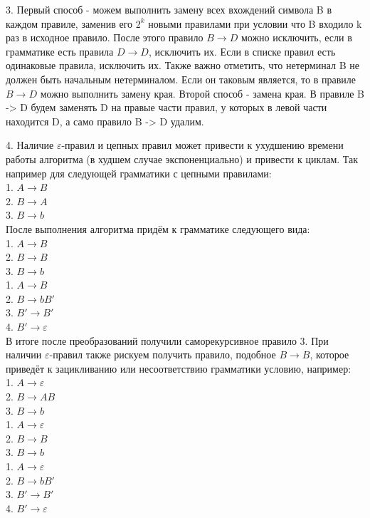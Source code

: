 \documentclass[a4paper,14pt]{extarticle}
\begin{document}
3. Первый способ - можем выполнить замену всех вхождений 
символа B в каждом правиле, заменив его $2^k$ новыми правилами 
при условии что B входило k раз в исходное правило. 
После этого правило $B \rightarrow D$ можно исключить, если в 
грамматике есть правила $D \rightarrow D$, исключить их.
Если в списке правил есть одинаковые правила, исключить их.
Также важно отметить, что нетерминал B не должен быть начальным
нетерминалом. Если он таковым является, то в правиле 
$B \rightarrow D$ можно выполнить замену края. 
Второй способ - замена края. В правиле B -> D будем заменять D на 
правые части правил, у которых в левой части находится D, 
а само правило B -> D удалим.

4. Наличие $\varepsilon$-правил и цепных правил может привести
к ухудшению времени работы алгоритма (в худшем случае 
экспоненциально) и привести к циклам. 
Так например для следующей грамматики с цепными правилами:\\
1. $A \rightarrow B$\\
2. $B \rightarrow A$\\
3. $B \rightarrow b$\\
После выполнения алгоритма придём к грамматике следующего вида:\\
1. $A \rightarrow B$\\
2. $B \rightarrow B$\\
3. $B \rightarrow b$\\

1. $A \rightarrow B$\\
2. $B \rightarrow bB'$\\
3. $B' \rightarrow B'$\\
4. $B' \rightarrow \varepsilon$\\

В итоге после преобразований получили саморекурсивное правило 3.
При наличии $\varepsilon$-правил также рискуем получить правило, подобное $B \rightarrow B$,
которое приведёт к зацикливанию или несоответствию грамматики условию, например:\\
1. $A \rightarrow \varepsilon$\\
2. $B \rightarrow AB$\\
3. $B \rightarrow b$\\

1. $A \rightarrow \varepsilon$\\
2. $B \rightarrow B$\\
3. $B \rightarrow b$\\

1. $A \rightarrow \varepsilon$\\
2. $B \rightarrow bB'$\\
3. $B' \rightarrow B'$\\
4. $B' \rightarrow \varepsilon$\\
\end{document}
